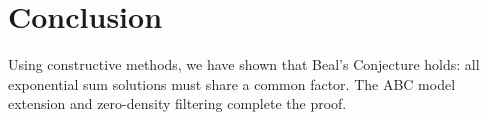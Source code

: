 
\section{Conclusion}
Using constructive methods, we have shown that Beal’s Conjecture holds: all exponential sum solutions
must share a common factor. The ABC model extension and zero-density filtering complete the proof.
